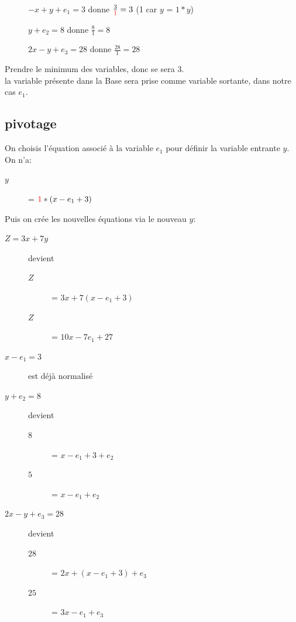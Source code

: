 \begin{description}
\item[] $ -x + y + e_1 = 3$ donne $\frac{3}{\textcolor{red}{1}} = 3$ (1 car $y$ = $1*y$)
\item[] $ y + e_2 = 8$ donne $\frac{8}{1} = 8$
\item[] $ 2x - y + e_3 = 28$ donne $\frac{28}{1} = 28$
\end{description}
Prendre le minimum des variables, donc se sera $3$.\\
la variable présente dans la Base sera prise comme variable sortante, dans notre cas $e_1$.\\
\pagebreak
\subsection{pivotage}
On choisis l'équation associé à la variable $e_1$ pour définir la variable entrante $y$.\\
On n'a:
\begin{description}
\item[$y$] = $\textcolor{red}{1}*(x - e_1 + 3)$
\end{description}

Puis on crée les nouvelles équations via le nouveau $y$:
\begin{description}
\item[$Z = 3x + 7y$] devient
\begin{description}
\item[$Z$] = $3x + 7(x - e_1 + 3)$
\item[$Z$] = $10x - 7e_1 + 27$
\end{description}
\item[$x - e_1 = 3$] est déjà normalisé
\item[$y + e_2 = 8$] devient
\begin{description}
\item[$8$] = $x -e_1 + 3 + e_2$
\item[$5$] = $x - e_1 + e_2$
\end{description}
\item[$2x - y + e_3 = 28$] devient
\begin{description}
\item[$28$] = $2x + (x - e_1 + 3) + e_3$
\item[$25$] = $3x - e_1 + e_3$
\end{description}
\end{description}
